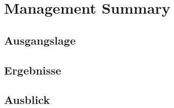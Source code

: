 \newpage
{}
\chapter*{Management Summary}
\section*{Ausgangslage}

\section*{Ergebnisse}

\section*{Ausblick}

